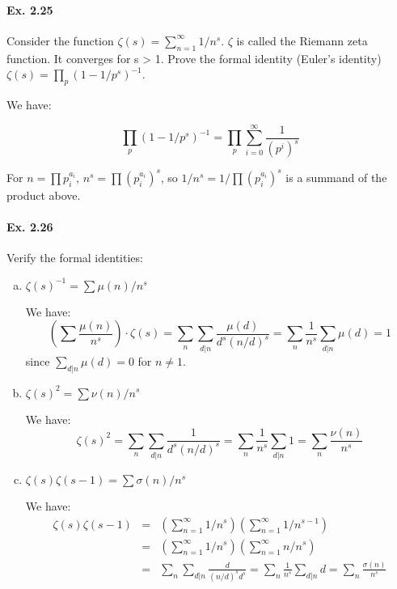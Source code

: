 \documentclass[notitlepage]{article}
\theoremstyle{definition}
\begin{document}
\paragraph{Ex. 2.25}
Consider the function $\zeta(s) = \sum_{n=1}^\infty 1/n^s$. $\zeta$
is called the Riemann zeta function. It converges for s > 1. Prove the
formal identity (Euler's identity) $\zeta(s) = \prod_p (1-1/p^s)^{-1}$.

We have:

\begin{equation}
  \prod_p (1-1/p^s)^{-1} = \prod_p \sum_{i=0}^\infty \frac{1}{(p^i)^s}
\end{equation}

For $n = \prod p_i^{a_i}$, $n^s = \prod (p_i^{a_i})^s$, so $1/n^s =
1/\prod (p_i^{a_i})^s$ is a summand of the product above.

\paragraph{Ex. 2.26}
Verify the formal identities:
\begin{enumerate}[a)]
\item $\zeta(s)^{-1} = \sum \mu(n)/n^s$

We have:
\begin{equation}
  \left(\sum \frac{\mu(n)}{n^s}\right) \cdot \zeta(s)  = \sum_n \sum_{d|n} \frac{\mu(d)}{d^s(n/d)^s} = \sum_n \frac{1}{n^s}\sum_{d|n} \mu(d) = 1
\end{equation}
since $\sum_{d|n} \mu(d) = 0$ for $n \ne 1$.

\item $\zeta(s)^{2} = \sum \nu(n)/n^s$

We have:
\begin{equation}
  \zeta(s)^2 = \sum_n \sum_{d|n} \frac{1}{d^s(n/d)^s} = \sum_n
  \frac{1}{n^s}\sum_{d|n} 1 =\sum_n \frac{\nu(n)}{n^s}
\end{equation}

\item $\zeta(s)\zeta(s-1) = \sum \sigma(n)/n^s$

  We have:
\begin{eqnarray}
  \zeta(s)\zeta(s-1) &=& \left(\sum_{n=1}^\infty 1/n^s\right)
  \left(\sum_{n=1}^\infty 1/n^{s-1}\right) \\ &=&
  \left(\sum_{n=1}^\infty 1/n^s\right)\left(\sum_{n=1}^\infty
  n/n^s\right) \\
  &=& \sum_n \sum_{d|n} \frac{d}{(n/d)^sd^s} = \sum_n
  \frac{1}{n^s} \sum_{d|n} d = \sum_n \frac{\sigma(n)}{n^s}
\end{eqnarray}
\end{enumerate}
\end{document}

